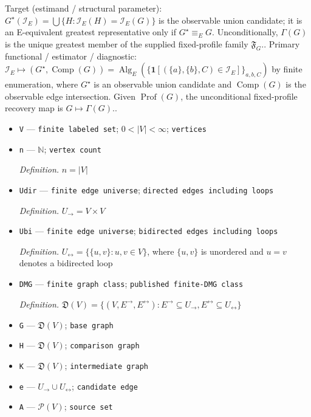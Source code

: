 \documentclass{article}
\begin{document}
Target (estimand / structural parameter): \(G^\star(\mathcal I_E)=\bigcup\{H:\mathcal I_E(H)=\mathcal I_E(G)\}\) is the observable union candidate; it is an E-equivalent greatest representative only if \(G^\star\equiv_EG\). Unconditionally, \(\Gamma(G)\) is the unique greatest member of the supplied fixed-profile family \(\mathfrak F_G\)..
Primary functional / estimator / diagnostic: \(\mathcal I_E\mapsto(G^\star,\operatorname{Comp}(G))=\operatorname{Alg}_E(\{\mathbf 1[(\{a\},\{b\},C)\in\mathcal I_E]\}_{a,b,C})\) by finite enumeration, where \(G^\star\) is an observable union candidate and \(\operatorname{Comp}(G)\) is the observable edge intersection. Given \(\operatorname{Prof}(G)\), the unconditional fixed-profile recovery map is \(G\mapsto\Gamma(G)\)..
\begin{itemize}
  \item \texttt{V} --- \texttt{finite labeled set}; \(0<|V|<\infty\); \texttt{vertices}
  \item \texttt{n} --- \(\mathbb N\); \texttt{vertex count}
  \par\smallskip\noindent\emph{Definition.} \(n=|V|\)
  \item \texttt{Udir} --- \texttt{finite edge universe}; \texttt{directed edges including loops}
  \par\smallskip\noindent\emph{Definition.} \(U_{\to}=V\times V\)
  \item \texttt{Ubi} --- \texttt{finite edge universe}; \texttt{bidirected edges including loops}
  \par\smallskip\noindent\emph{Definition.} \(U_{\leftrightarrow}=\{\{u,v\}:u,v\in V\}\), where \(\{u,v\}\) is unordered and \(u=v\) denotes a bidirected loop
  \item \texttt{DMG} --- \texttt{finite graph class}; \texttt{published finite-\allowbreak{}DMG class}
  \par\smallskip\noindent\emph{Definition.} \(\mathfrak D(V)=\{(V,E^{\to},E^{\leftrightarrow}):E^{\to}\subseteq U_{\to},E^{\leftrightarrow}\subseteq U_{\leftrightarrow}\}\)
  \item \texttt{G} --- \(\mathfrak D(V)\); \texttt{base graph}
  \item \texttt{H} --- \(\mathfrak D(V)\); \texttt{comparison graph}
  \item \texttt{K} --- \(\mathfrak D(V)\); \texttt{intermediate graph}
  \item \texttt{e} --- \(U_{\to}\cup U_{\leftrightarrow}\); \texttt{candidate edge}
  \item \texttt{A} --- \(\mathcal P(V)\); \texttt{source set}

\end{itemize}
\end{document}
